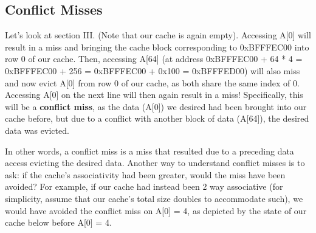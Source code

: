 \documentclass{article}
\begin{document}
\subsection{Conflict Misses}

Let's look at section III. (Note that our cache is again empty). Accessing A[0] will result in a miss and bringing the cache block corresponding to 0xBFFFEC00 into row 0 of our cache. Then, accessing A[64] (at address 0xBFFFEC00 + 64 * 4 = 0xBFFFEC00 + 256 = 0xBFFFEC00 + 0x100 = 0xBFFFED00) will also miss and now evict A[0] from row 0 of our cache, as both share the same index of 0. Accessing A[0]  on the next line will then again result in a miss! Specifically, this will be a \textbf{conflict miss}, as the data (A[0]) we desired had been brought into our cache before, but due to a conflict with another block of data (A[64]), the desired data was evicted. 

\begin{center}
\end{center}

In other words, a conflict miss is a miss that resulted due to a preceding data access evicting the desired data. Another way to understand conflict misses is to ask: if the cache's associativity had been greater, would the miss have been avoided? For example, if our cache had instead been 2 way associative (for simplicity, assume that our cache's total size doubles to accommodate such), we would have avoided the conflict miss on A[0] = 4, as depicted by the state of our cache below before A[0] = 4. 
\end{document}
